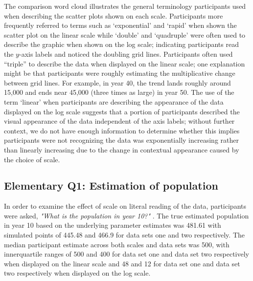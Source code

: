 \documentclass[print]{nuthesis}
\begin{document}
The comparison word cloud illustrates the general terminology participants used when describing the scatter plots shown on each scale.
Participants more frequently referred to terms such as `exponential' and `rapid' when shown the scatter plot on the linear scale while `double' and `quadruple' were often used to describe the graphic when shown on the log scale; indicating participants read the \(y\)-axis labels and noticed the doubling grid lines.
Participants often used ``triple'' to describe the data when displayed on the linear scale; one explanation might be that participants were roughly estimating the multiplicative change between grid lines.
For example, in year 40, the trend lands roughly around 15,000 and ends near 45,000 (three times as large) in year 50.
The use of the term `linear' when participants are describing the appearance of the data displayed on the log scale suggests that a portion of participants described the visual appearance of the data independent of the axis labels; without further context, we do not have enough information to determine whether this implies participants were not recognizing the data was exponentially increasing rather than linearly increasing due to the change in contextual appearance caused by the choice of scale.

\hypertarget{eq1-results}{%
\subsection{Elementary Q1: Estimation of population}\label{eq1-results}}

In order to examine the effect of scale on literal reading of the data, participants were asked, \textit{"What is the population in year 10?"} .
The true estimated population in year 10 based on the underlying parameter estimates was 481.61 with simulated points of 445.48 and 466.9 for data sets one and two respectively.
The median participant estimate across both scales and data sets was 500, with innerquartile ranges of 500 and 400 for data set one and data set two respectively when displayed on the linear scale and 48 and 12 for data set one and data set two respectively when displayed on the log scale.
\end{document}

